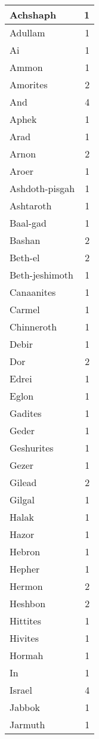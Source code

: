 \begin{center}
\begin{longtable}{l|r}
\hline \hline
\endlastfoot
Achshaph & 1 \\ \hline
Adullam & 1 \\ \hline
Ai & 1 \\ \hline
Ammon & 1 \\ \hline
Amorites & 2 \\ \hline
And & 4 \\ \hline
Aphek & 1 \\ \hline
Arad & 1 \\ \hline
Arnon & 2 \\ \hline
Aroer & 1 \\ \hline
Ashdoth-pisgah & 1 \\ \hline
Ashtaroth & 1 \\ \hline
Baal-gad & 1 \\ \hline
Bashan & 2 \\ \hline
Beth-el & 2 \\ \hline
Beth-jeshimoth & 1 \\ \hline
Canaanites & 1 \\ \hline
Carmel & 1 \\ \hline
Chinneroth & 1 \\ \hline
Debir & 1 \\ \hline
Dor & 2 \\ \hline
Edrei & 1 \\ \hline
Eglon & 1 \\ \hline
Gadites & 1 \\ \hline
Geder & 1 \\ \hline
Geshurites & 1 \\ \hline
Gezer & 1 \\ \hline
Gilead & 2 \\ \hline
Gilgal & 1 \\ \hline
Halak & 1 \\ \hline
Hazor & 1 \\ \hline
Hebron & 1 \\ \hline
Hepher & 1 \\ \hline
Hermon & 2 \\ \hline
Heshbon & 2 \\ \hline
Hittites & 1 \\ \hline
Hivites & 1 \\ \hline
Hormah & 1 \\ \hline
In & 1 \\ \hline
Israel & 4 \\ \hline
Jabbok & 1 \\ \hline
Jarmuth & 1 \\ \hline

\end{longtable}
\end{center}
